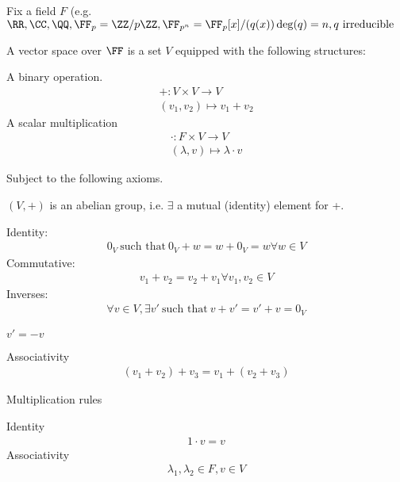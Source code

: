 \documentclass[class=scrartcl, crop=false]{standalone}
\begin{document}
\begin{definition}
  Fix a field $F$ (e.g. $\RR, \CC, \QQ, \FF_p = \ZZ / p \ZZ, \FF_{p^n} = \FF_p[x] / (q(x)) \deg(q) = n, q \text{ irreducible}$ 

  A vector space over $\FF$ is a set $V$ equipped with the following structures:
  \begin{enumerate}
    \ii
    A binary operation.
    \begin{gather*}
      +: V \times V \to V \\
      (v_1, v_2) \mapsto v_1 + v_2
    \end{gather*} 
    \ii
    A scalar multiplication
    \begin{gather*}
      \cdot: F \times V \to V \\
      (\lambda, v) \mapsto \lambda \cdot v
    \end{gather*} 
  \end{enumerate} 
  Subject to the following axioms.
  \begin{enumerate}
    \ii
    $(V, +)$ is an abelian group, i.e. $\exists$ a mutual (identity) element for +.
    \begin{enumerate}
      \ii Identity:
      \begin{gather*}
        0_V \ \text{such that} \ 0_V + w = w + 0_V = w \forall w \in V
      \end{gather*} 
      \ii Commutative:
      \begin{gather*}
        v_1 + v_2 = v_2 + v_1 \forall v_1, v_2 \in V
      \end{gather*} 
      \ii Inverses:
      \begin{gather*}
        \forall v \in V, \exists v' \ \text{such that} \ v + v' = v' + v = 0_V
      \end{gather*} 
      \begin{note}
        $v' = -v$
      \end{note} 
      \ii Associativity
      \begin{gather*}
        (v_1 + v_2) + v_3 = v_1 + (v_2 + v_3)
      \end{gather*} 
    \end{enumerate} 
    \ii
    Multiplication rules
    \begin{enumerate}
      \ii
      Identity
      \begin{gather*}
        1 \cdot v = v
      \end{gather*} 
      \ii
      Associativity
      \begin{gather*}
        \lambda_1, \lambda_2 \in F, v \in V \\

\end{gather*}
\end{enumerate}
\end{enumerate}
\end{definition}
\end{document}
